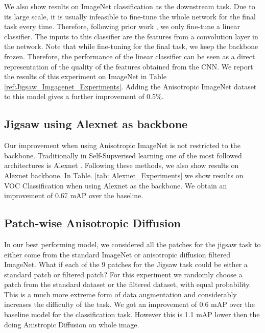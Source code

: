 \documentclass{bmvc2k}
\begin{document}
We also show results on ImageNet classification as the downstream task. 
Due to its
large scale, it is usually infeasible to fine-tune the whole network for the final task every time.
Therefore, following prior work \cite{Caron2018DeepCF}, we only fine-tune a linear classifier. 
The inputs to this classifier are the features from a convolution layer in the network. Note that while fine-tuning for the final task, we keep the backbone frozen. Therefore, the performance of the linear classifier can
be seen as a direct representation of the quality of the features obtained from the CNN.  
We report
the results of this experiment on ImageNet in Table \ref{ref:Jigsaw_Imgagenet_Experiments}. 
Adding the Anisotropic ImageNet dataset to this model gives a further improvement of 0.5\%. 




\subsection{Jigsaw using Alexnet as backbone}
Our improvement when using Anisotropic ImageNet is not restricted to the backbone. Traditionally in Self-Supverised learning one of the most followed architectures is Alexnet \cite{Noroozi2016UnsupervisedLO, Doersch2015UnsupervisedVR, Caron2018DeepCF}. Following these methods, we also show results on Alexnet backbone.  
In Table. \ref{tab: Alexnet_Experiments} we show results on VOC Classification when using Alexnet as the backbone. We obtain an improvement of 0.67 mAP over the baseline. 


\subsection{Patch-wise Anisotropic Diffusion} 
In our best performing model, we considered all the patches for the jigsaw task to either come from the standard ImageNet or anisotropic diffusion filtered ImageNet. What if each of the 9 patches for the Jigsaw task could be either a standard patch or filtered patch?  For this experiment we randomly choose a patch from the standard dataset or the filtered dataset, with equal probability. This is a much more extreme form of data augmentation and considerably increases the difficulty of the task. We got an improvement of 0.6 mAP over the baseline model for the classification task. However this is 1.1 mAP lower then the doing Anistropic Diffusion on whole image. 
 
\end{document}

